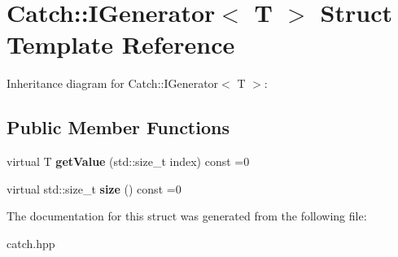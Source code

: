 \hypertarget{structCatch_1_1IGenerator}{}\section{Catch\+:\+:I\+Generator$<$ T $>$ Struct Template Reference}
\label{structCatch_1_1IGenerator}


Inheritance diagram for Catch\+:\+:I\+Generator$<$ T $>$\+:
\subsection*{Public Member Functions}
\begin{DoxyCompactItemize}
\item 
virtual T {\bfseries get\+Value} (std\+::size\+\_\+t index) const =0\hypertarget{structCatch_1_1IGenerator_ad69e937cb66dba3ed9429c42abf4fce3}{}\label{structCatch_1_1IGenerator_ad69e937cb66dba3ed9429c42abf4fce3}

\item 
virtual std\+::size\+\_\+t {\bfseries size} () const =0\hypertarget{structCatch_1_1IGenerator_a2e317253b03e838b6065ce69719a198e}{}\label{structCatch_1_1IGenerator_a2e317253b03e838b6065ce69719a198e}

\end{DoxyCompactItemize}


The documentation for this struct was generated from the following file\+:\begin{DoxyCompactItemize}
\item 
catch.\+hpp\end{DoxyCompactItemize}
